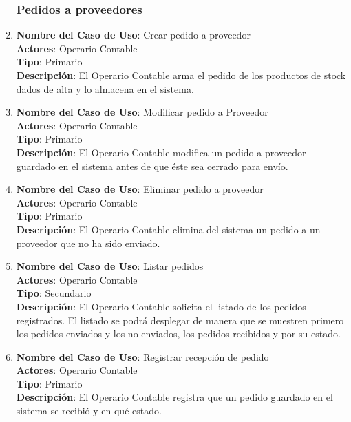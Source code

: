 \documentclass[12pt]{extarticle}
\begin{document}
\begin{spacing}{1.2}
\begin{enumerate}
        \subsubsection{Pedidos a proveedores}



        \item 	\textbf{Nombre del Caso de Uso}: Crear pedido a proveedor\\
                \textbf{Actores}: Operario Contable\\
                \textbf{Tipo}: Primario\\
                \textbf{Descripción}: El Operario Contable arma el pedido de los productos de stock dados de alta y lo almacena en el sistema.

        \item 	\textbf{Nombre del Caso de Uso}: Modificar pedido a Proveedor\\
                \textbf{Actores}: Operario Contable\\
                \textbf{Tipo}: Primario\\
                \textbf{Descripción}: El Operario Contable modifica un pedido a proveedor guardado en el sistema antes de que éste sea cerrado para envío.

        \item 	\textbf{Nombre del Caso de Uso}: Eliminar pedido a proveedor\\
                \textbf{Actores}: Operario Contable\\
                \textbf{Tipo}: Primario\\
                \textbf{Descripción}: El Operario Contable elimina del sistema un pedido a un proveedor que no ha sido enviado.


        \item 	\textbf{Nombre del Caso de Uso}: Listar pedidos \\
                \textbf{Actores}: Operario Contable\\
                \textbf{Tipo}: Secundario\\
                \textbf{Descripción}: El Operario Contable solicita el listado de los pedidos registrados. El listado se podrá desplegar de manera que se muestren primero los pedidos enviados y los no enviados, los pedidos recibidos y por su estado.

        \item 	\textbf{Nombre del Caso de Uso}: Registrar recepción de pedido\\
                \textbf{Actores}: Operario Contable\\
                \textbf{Tipo}: Primario\\
                \textbf{Descripción}: El Operario Contable registra que un pedido guardado en el sistema se recibió y en qué estado. 


\end{enumerate}
\end{spacing}
\end{document}
